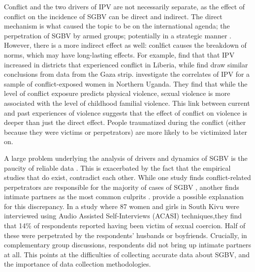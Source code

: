 \documentclass[10pt,a4paper,abstract=on]{scrartcl} %
\begin{document}
Conflict and the two drivers of IPV are not necessarily separate, as the effect of conflict on the incidence of SGBV can be direct and indirect. The direct mechanism is what caused the topic to be on the international agenda; the perpetration of SGBV by armed groups; potentially in a strategic manner \citep{Baaz2013,Kirby2015}. However, there is a more indirect effect as well: conlfict causes the breakdown of norms, which may have long-lasting effects. For example, \cite{Kelly2018} find that that IPV increased in districts that experienced conflict in Liberia, while \cite{Muller2019} find draw similar conclusions from data from the Gaza strip. \cite{Saile2013} investigate the correlates of IPV for a sample of conflict-exposed women in Northern Uganda. They find that while the level of conflict exposure predicts physical violence, sexual violence is more associated with the level of childhood familial violence. This link between current and past experiences of violence suggests that the effect of conflict on violence is deeper than just the direct effect. People traumatized during the conflict (either because they were victims or perpetrators) are more likely to be victimized later on. 


A large problem underlying the analysis of drivers and dynamics of SGBV is the paucity of reliable data \citep{Palermo2011}. This is exacerbated by the fact that the empirical studies that do exist, contradict each other. While one study finds conflict-related perpetrators are responsible for the majority of cases of SGBV \citep{Johnson2010}, another finds intimate partners as the most common culprits \citep{Peterman2011}. \citet{Stark2017} provide a possible explanation for this discrepancy. In a study where 87 women and girls in South Kivu were interviewed using Audio Assisted Self-Interviews (ACASI) techniques,they find that 14\% of respondents reported having been victim of sexual coercion. Half of these were perpetrated by the respondents' husbands or boyfriends. Crucially, in complementary group discussions, respondents did not bring up intimate partners at all. This points at the difficulties of collecting accurate data about SGBV, and the importance of data collection methodologies. 
\end{document}
